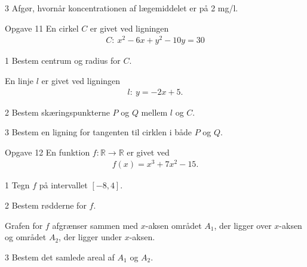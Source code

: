 \begin{delopgave}{}{3}
	Afgør, hvornår koncentrationen af lægemiddelet er på 2 mg/l.
\end{delopgave}
\begin{opgavetekst}{Opgave 11}
	En cirkel $C$ er givet ved ligningen 
	\begin{align*}
		C: \ x^2-6x+y^2-10y=30
	\end{align*}
\end{opgavetekst}
\begin{delopgave}{}{1}
	Bestem centrum og radius for $C$.
\end{delopgave}
\begin{meretekst}
	En linje $l$ er givet ved ligningen 
	\begin{align*}
		l: \ y = -2x+5.
	\end{align*}
\end{meretekst}
\begin{delopgave}{}{2}
	Bestem skæringspunkterne $P$ og $Q$ mellem $l$ og $C$. 
\end{delopgave}
\begin{delopgave}{}{3}
	Bestem en ligning for tangenten til cirklen i både $P$ og $Q$.
\end{delopgave}
\begin{opgavetekst}{Opgave 12}
	En funktion $f: \mathbb{R} \to \mathbb{R}$ er givet ved
	\begin{align*}
		f(x) = x^3+7x^2-15.
	\end{align*}	 
\end{opgavetekst}
\begin{delopgave}{}{1}
	Tegn $f$ på intervallet $[-8,4]$.
\end{delopgave}
\begin{delopgave}{}{2}
	Bestem rødderne for $f$. 
\end{delopgave}
\begin{meretekst}
	Grafen for $f$ afgrænser sammen med $x$-aksen området $A_1$, der ligger over $x$-aksen og området $A_2$, der ligger under $x$-aksen.
\end{meretekst}
\begin{delopgave}{}{3}
	Bestem det samlede areal af $A_1$ og $A_2$. 
\end{delopgave}